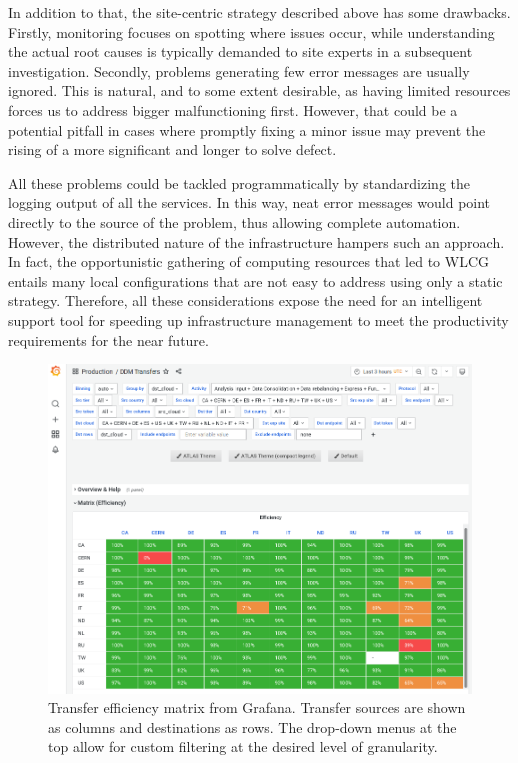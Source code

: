 In addition to that, the site-centric strategy described above has some drawbacks. Firstly, monitoring focuses on spotting where issues occur, while understanding the actual root causes is typically demanded to site experts in a subsequent investigation.
Secondly, problems generating few error messages are usually ignored. This is natural, and to some extent desirable, as having limited resources forces us to address bigger malfunctioning first. However, that could be a potential pitfall in cases where promptly fixing a minor issue may prevent the rising of a more significant and longer to solve defect.

All these problems could be tackled programmatically by standardizing the logging output of all the services. In this way, neat error messages would point directly to the source of the problem, thus allowing complete automation. 
However, the distributed nature of the infrastructure hampers such an approach.
In fact, the opportunistic gathering of computing resources that led to WLCG entails many local configurations that are not easy to address using only a static strategy.
Therefore, all these considerations expose the need for an intelligent support tool for speeding up infrastructure management to meet the productivity requirements for the near future.

\begin{landscape}
\begin{figure}
    \centering
    \includegraphics[height=\textwidth]{figures/220_introduction/grafana_efficiency_matrix_narrow1.png}
    \caption{Transfer efficiency matrix from Grafana. Transfer sources are shown as columns and destinations as rows. The drop-down menus at the top allow for custom filtering at the desired level of granularity.}
    \label{fig:efficiency_matrix}
\end{figure}
\end{landscape}